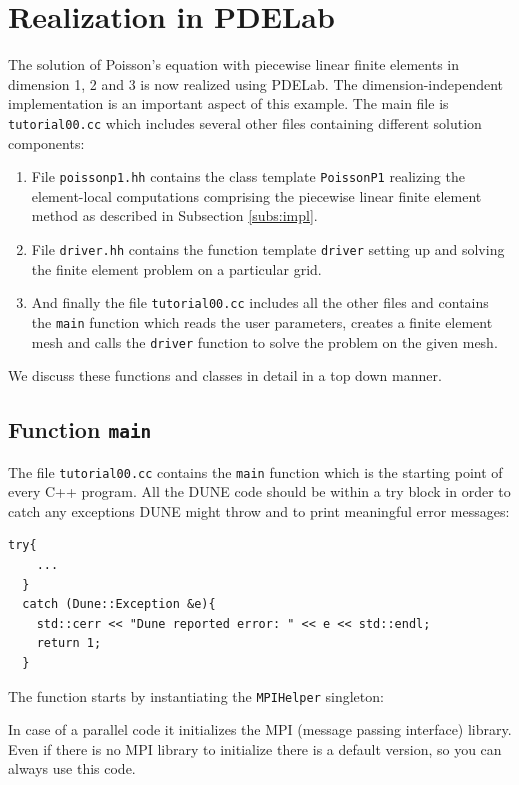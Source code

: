 \documentclass[a4paper,12pt]{article}
\begin{document}
\section{Realization in PDELab}

The solution of Poisson's equation with piecewise linear
finite elements in dimension 1, 2 and 3 is now realized using
PDELab. The dimension-independent
implementation is an important aspect of this example.
The main file is \lstinline{tutorial00.cc} which includes several other files containing different
solution components:
\begin{enumerate}[1)]
\item File \lstinline{poissonp1.hh} contains the class template \lstinline{PoissonP1} 
realizing the element-local computations
comprising the piecewise linear finite element method as described
in Subsection \ref{subs:impl}.
\item File \lstinline{driver.hh} contains the function template
\lstinline{driver} setting up and solving the finite element problem
on a particular grid.
\item And finally the file \lstinline{tutorial00.cc} 
includes all the other files and contains the \lstinline{main} function which reads the user
parameters, creates a finite element mesh and calls the \lstinline{driver}
function to solve the problem on the given mesh.
\end{enumerate}
We discuss these functions and classes in detail in a top down manner.

\subsection{Function \lstinline{main}}

The file \lstinline{tutorial00.cc} contains the \lstinline{main} function
which is the starting point of every C++ program. All the DUNE code should
be within a try block in order to catch any exceptions DUNE might throw
and to print meaningful error messages:
\begin{lstlisting}[basicstyle=\ttfamily\small,
frame=single,
backgroundcolor=\color{listingbg}]
  try{
    ...
  }
  catch (Dune::Exception &e){
    std::cerr << "Dune reported error: " << e << std::endl;
	return 1;
  }
\end{lstlisting}

The function starts by instantiating the \lstinline{MPIHelper}
singleton:

In case of a parallel code it initializes the MPI (message passing interface)
library. Even if there is no MPI library to initialize there is a default version,
so you can always use this code.
\end{document}
